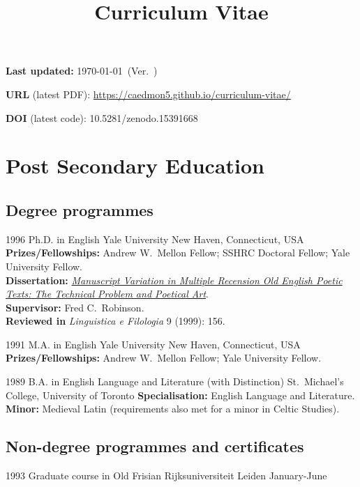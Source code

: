 \documentclass[11pt,letterpaper,sans]{moderncv}
\title{Curriculum Vitae}
\newcommand{\lastupdated}{\today}
\newif\ifcompactcv
\newcommand{\onlineonly}[1]{\ifcompactcv\else#1\fi}
\begin{document}
\makecvtitle

\vspace{-1em}
\hfill {\small \textbf{Last updated:} \lastupdated\ (Ver.~\cvversion\ifcompactcv, compact version\fi)}

\hfill {\small \textbf{URL} (latest PDF): \url{https://caedmon5.github.io/curriculum-vitae/}

\hfill {\small \textbf{DOI} (latest code): 10.5281/zenodo.15391668}

\section{\textbf{Post Secondary Education}}

\onlineonly{}
\subsection*{\textbf{Degree programmes}}
\cventry
  {1996}
  {Ph.D. in English}
  {Yale University}
  {New Haven, Connecticut, USA}
  {}
  {%
    \textbf{Prizes/Fellowships:} Andrew W.\ Mellon Fellow; SSHRC Doctoral Fellow; Yale University Fellow.\\
    \textbf{Dissertation:}
    \emph{\href{https://doi.org/10.5281/zenodo.1171976}{Manuscript Variation in Multiple Recension Old English Poetic Texts:
    The Technical Problem and Poetical Art}}.\\
    \textbf{Supervisor:} Fred C.\ Robinson.\\
    \textbf{Reviewed in} \emph{Linguistica e Filologia} 9 (1999): 156.
  }

\cventry
  {1991}
  {M.A. in English}
  {Yale University}
  {New Haven, Connecticut, USA}
  {}
  {%
    \textbf{Prizes/Fellowships:} Andrew W.\ Mellon Fellow; Yale University Fellow.
  }

\cventry
  {1989}
  {B.A. in English Language and Literature (with Distinction)}
  {St.~Michael’s College, University of Toronto}
  {}
  {}
  {%
    \textbf{Specialisation:} English Language and Literature.\\
    \textbf{Minor:} Medieval Latin (requirements also met for a minor in Celtic Studies).
  }
\subsection*{\textbf{Non-degree programmes and certificates}}
\cventry
  {1993}
  {Graduate course in Old Frisian}
  {Rijksuniversiteit Leiden}
  {}
  {January-June}
  {}

}
\end{document}
